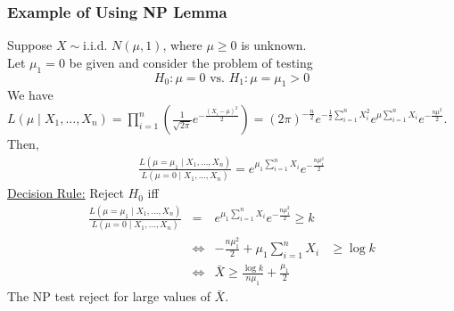 \documentclass[11pt]{elegantbook}
\begin{document}
\subsubsection*{Example of Using NP Lemma}
\begin{example}
    Suppose $X\sim \text{i.i.d. } N(\mu,1)$, where $\mu\geq 0$ is unknown.\\
    Let $\mu_1=0$ be given and consider the problem of testing $$H_0:\mu=0 \text{ vs. }H_1:\mu=\mu_1>0$$
    We have $L(\mu\mid X_1,...,X_n)=\prod_{i=1}^n \left(\frac{1}{\sqrt{2\pi}}e^{-\frac{(X_i-\mu)^2}{2}}\right)=\left(2\pi\right)^{-\frac{n}{2}}e^{-\frac{1}{2}\sum_{i=1}^n X_i^2} e^{\mu\sum_{i=1}^n X_i}e^{-\frac{n\mu^2}{2}}$. Then,
    \begin{equation}
        \begin{aligned}
            \frac{L(\mu=\mu_1\mid X_1,...,X_n)}{L(\mu=0\mid X_1,...,X_n)}=e^{\mu_1\sum_{i=1}^n X_i}e^{-\frac{n\mu_1^2}{2}}
        \end{aligned}
        \nonumber
    \end{equation}
    \underline{Decision Rule:}
    Reject $H_0$ iff
    \begin{equation}
        \begin{aligned}
            \frac{L(\mu=\mu_1\mid X_1,...,X_n)}{L(\mu=0\mid X_1,...,X_n)}&=&e^{\mu_1\sum_{i=1}^n X_i}e^{-\frac{n\mu_1^2}{2}}\geq k\\
            &\Leftrightarrow& -\frac{n\mu_1^2}{2}+\mu_1\sum_{i=1}^n X_i&\geq \log k\\
            &\Leftrightarrow& \bar{X}\geq \frac{\log k }{n\mu_1}+\frac{\mu_1}{2}
        \end{aligned}
        \nonumber
    \end{equation}
    The NP test reject for large values of $\bar{X}$.
\end{example}
\end{document}
